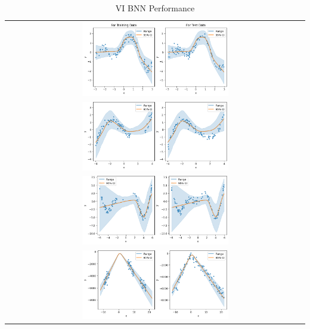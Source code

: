 \documentclass[conference]{IEEEtran}
\begin{document}
\begin{table}[H]
\centering
\begin{tabular}{c}
\includegraphics[width=0.5\textwidth]{images/vi_bnn--problem_A--sb.png}\\
\includegraphics[width=0.5\textwidth]{images/vi_bnn--problem_B--sb.png}\\
\includegraphics[width=0.5\textwidth]{images/vi_bnn--problem_C--sb.png}\\
\includegraphics[width=0.5\textwidth]{images/vi_bnn--problem_D--sb.png}\\
\end{tabular}
\caption{VI BNN Performance}
\label{tbl:table_of_figures}
\end{table}
\end{document}
